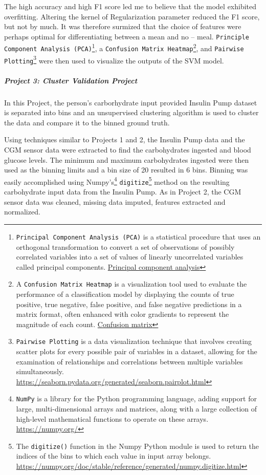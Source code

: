 The high accuracy and high F1 score led me to believe that the model exhibited overfitting.  Altering the kernel of Regularization parameter reduced the F1 score, but not by much.  It was therefore surmized that the choice of features were perhaps optimal for differentiating between a mean and no -- meal.  \texttt{Principle Component Analysis (PCA)}\footnote{\texttt{Principal Component Analysis (PCA)} is a statistical procedure that uses an orthogonal transformation to convert a set of observations of possibly correlated variables into a set of values of linearly uncorrelated variables called principal components. \href{https://en.wikipedia.org/wiki/Principal\_component\_analysis}{Principal component analysis}}, a \texttt{Confusion Matrix Heatmap}\footnote{A \texttt{Confusion Matrix Heatmap} is a visualization tool used to evaluate the performance of a classification model by displaying the counts of true positive, true negative, false positive, and false negative predictions in a matrix format, often enhanced with color gradients to represent the magnitude of each count. \href{https://en.wikipedia.org/wiki/Confusion\_matrix}{Confusion matrix}}, and \texttt{Pairwise Plotting}\footnote{\texttt{Pairwise Plotting} is a data visualization technique that involves creating scatter plots for every possible pair of variables in a dataset, allowing for the examination of relationships and correlations between multiple variables simultaneously. \href{https://seaborn.pydata.org/generated/seaborn.pairplot.html}{https://seaborn.pydata.org/generated/seaborn.pairplot.html}} were then used to visualize the outputs of the SVM model.

\subparagraph{Project 3: Cluster Validation Project}

In this Project, the person's carborhydrate input provided Insulin Pump dataset is separated into bins and an unsupervised clustering algorithm is used to cluster the data and compare it to the binned ground truth.

Using techniques similar to Projects 1 and 2, the Insulin Pump data and the CGM sensor data were extracted to find the carbohydrates ingested and blood glucose levels.  The minimum and maximum carbohydrates ingested were then used as the binning limits and a bin size of 20 resulted in 6 bins.  Binning was easily accomplished using Numpy's\footnote{\texttt{NumPy} is a library for the Python programming language, adding support for large, multi-dimensional arrays and matrices, along with a large collection of high-level mathematical functions to operate on these arrays. \url{https://numpy.org/}} \texttt{digitize}\footnote{The \texttt{digitize()} function in the Numpy Python module is used to return the indices of the bins to which each value in input array belongs. \href{https://numpy.org/doc/stable/reference/generated/numpy.digitize.html}{https://numpy.org/doc/stable/reference/generated/numpy.digitize.html}} method on the resulting carbohydrate input data from the Insulin Pump.  As in Project 2, the CGM sensor data was cleaned, missing data imputed, features extracted and normalized.


